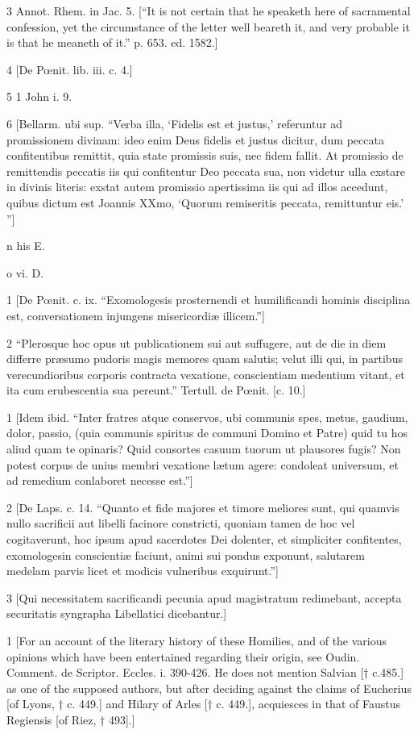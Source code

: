 3
Annot. Rhem. in Jac. 5. [“It is not certain that he speaketh here of sacramental confession, yet the circumstance of the letter well beareth it, and very probable it is that he meaneth of it.” p. 653. ed. 1582.]

4
[De Pœnit. lib. iii. c. 4.]

5
1 John i. 9.

6
[Bellarm. ubi sup. “Verba illa, ‘Fidelis est et justus,’ referuntur ad promissionem divinam: ideo enim Deus fidelis et justus dicitur, dum peccata confitentibus remittit, quia state promissis suis, nec fidem fallit. At promissio de remittendis peccatis iis qui confitentur Deo peccata sua, non videtur ulla exstare in divinis literis: exstat autem promissio apertissima iis qui ad illos accedunt, quibus dictum est Joannis XXmo, ‘Quorum remiseritis peccata, remittuntur eis.’ ”]

n
his E.

o
vi. D.

1
[De Pœnit. c. ix. “Exomologesis prosternendi et humilificandi hominis disciplina est, conversationem injungens misericordiæ illicem.”]

2
“Plerosque hoc opus ut publicationem sui aut suffugere, aut de die in diem differre præsumo pudoris magis memores quam salutis; velut illi qui, in partibus verecundioribus corporis contracta vexatione, conscientiam medentium vitant, et ita cum erubescentia sua pereunt.” Tertull. de Pœnit. [c. 10.]

1
[Idem ibid. “Inter fratres atque conservos, ubi communis spes, metus, gaudium, dolor, passio, (quia communis spiritus de communi Domino et Patre) quid tu hos aliud quam te opinaris? Quid consortes casuum tuorum ut plausores fugis? Non potest corpus de unius membri vexatione lætum agere: condoleat universum, et ad remedium conlaboret necesse est.”]

2
[De Laps. c. 14. “Quanto et fide majores et timore meliores sunt, qui quamvis nullo sacrificii aut libelli facinore constricti, quoniam tamen de hoc vel cogitaverunt, hoc ipsum apud sacerdotes Dei dolenter, et simpliciter confitentes, exomologesin conscientiæ faciunt, animi sui pondus exponunt, salutarem medelam parvis licet et modicis vulneribus exquirunt.”]

3
[Qui necessitatem sacrificandi pecunia apud magistratum redimebant, accepta securitatis syngrapha Libellatici dicebantur.]

1
[For an account of the literary history of these Homilies, and of the various opinions which have been entertained regarding their origin, see Oudin. Comment. de Scriptor. Eccles. i. 390-426. He does not mention Salvian [† c.485.] as one of the supposed authors, but after deciding against the claims of Eucherius [of Lyons, † c. 449.] and Hilary of Arles [† c. 449.], acquiesces in that of Faustus Regiensis [of Riez, † 493].]

